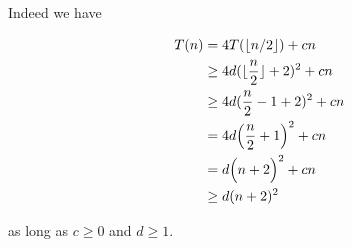 \documentclass[12pt]{article}
\begin{document}
\begin{enumerate}[1.]
\begin{enumerate}[1.]
\begin{mdframed}
        \bigskip

        Indeed we have

        \begin{align}
            T(n) &= 4T(\lfloor n/2 \rfloor) + cn\\
            &\geq 4d (\lfloor \frac{n}{2} \rfloor + 2)^2 + cn\\
            &\geq 4d (\frac{n}{2} - 1 + 2)^2 + cn\\
            &= 4d \Bigl( \frac{n}{2} + 1 \Bigr)^2 + cn\\
            &= d \Bigl( n + 2 \Bigr)^2 + cn\\
            &\geq d(n+2)^2
        \end{align}

        \bigskip

        as long as $c \geq 0$ and $d \geq 1$.

        \end{mdframed}

    \end{enumerate}

\end{enumerate}
\end{document}
